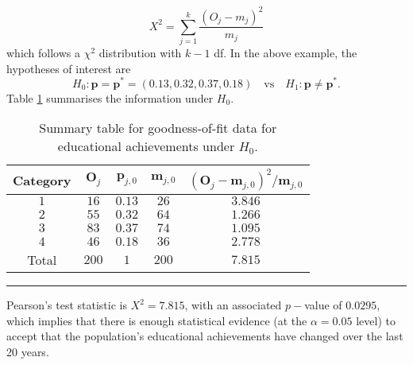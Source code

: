 $$
    X^{2}=\sum_{j=1}^{k}\frac{(O_{j}-m_{j})^{2}}{m_{j}}    
$$
which follows a $\chi^{2}$ distribution with $k-1$ df.
\newl In the above example, the hypotheses of interest are $$H_{0}: \bm{p}=\bm{p}^*=(0.13,0.32,0.37,0.18)\quad\mbox{vs}\quad H_{1}: \bm{p}\neq \bm{p}^*.$$ Table  \ref{tab:SA7} summarises the information under $H_{0}$.
     \begin{table}[!t]
         \centering
         \begin{tabular}{c c c c c}
         \hline
        \textbf{Category} & $\bm{O}_{j}$ & $\bm{p}_{j,0}$ & $\bm{m}_{j,0}$ & $(\bm{O}_{j}-\bm{m}_{j,0})^2/\bm{m}_{j,0}$  \\
         \hline
        $1$ & $16$ & $0.13$ & $26$ & $3.846$ \\
        $2$ & $55$ & $0.32$ & $64$ & $1.266$ \\
        $3$ & $83$ & $0.37$ & $74$ & $1.095$ \\
        $4$ & $46$ & $0.18$ & $36$ & $2.778$ \\
        \hline
        Total & $200$ & $1$ & $200$ & $7.815$\\
        \hline
         \end{tabular}
         \caption[\small Summary table for goodness-of-fit data for educational achievements]{\small Summary table for goodness-of-fit data for educational achievements under $H_0$.}
         \label{tab:SA7}\hrule
     \end{table}
\newl Pearson's test statistic is $X^{2}=7.815$, with an associated $p-$value of $0.0295$, which implies that there is enough statistical  evidence (at the $\alpha=0.05$ level) to accept that the population's educational achievements have changed over the last 20 years.



